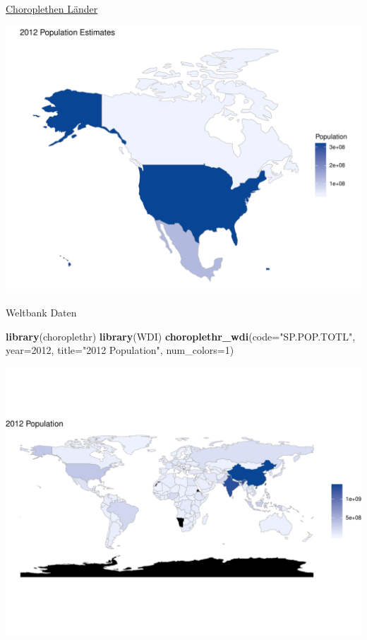\documentclass[ignorenonframetext,]{beamer}
\newenvironment{Shaded}{\begin{snugshade}}{\end{snugshade}}
\newcommand{\DataTypeTok}[1]{\textcolor[rgb]{0.13,0.29,0.53}{#1}}
\newcommand{\DecValTok}[1]{\textcolor[rgb]{0.00,0.00,0.81}{#1}}
\newcommand{\KeywordTok}[1]{\textcolor[rgb]{0.13,0.29,0.53}{\textbf{#1}}}
\newcommand{\NormalTok}[1]{#1}
\newcommand{\StringTok}[1]{\textcolor[rgb]{0.31,0.60,0.02}{#1}}
\begin{document}
\begin{frame}{\href{http://mirrors.softliste.de/cran/web/packages/choroplethr/vignettes/d-country-choropleth.html}{Choroplethen
Länder}}
\protect\hypertarget{choroplethen-lander-1}{}

\includegraphics{Choroplethen_files/figure-beamer/unnamed-chunk-24-1.pdf}

\end{frame}

\begin{frame}[fragile]{Weltbank Daten}
\protect\hypertarget{weltbank-daten}{}

\begin{Shaded}
\begin{Highlighting}[]
\KeywordTok{library}\NormalTok{(choroplethr)}
\KeywordTok{library}\NormalTok{(WDI) }
\KeywordTok{choroplethr_wdi}\NormalTok{(}\DataTypeTok{code=}\StringTok{"SP.POP.TOTL"}\NormalTok{, }\DataTypeTok{year=}\DecValTok{2012}\NormalTok{, }
                \DataTypeTok{title=}\StringTok{"2012 Population"}\NormalTok{, }
                \DataTypeTok{num_colors=}\DecValTok{1}\NormalTok{)}
\end{Highlighting}
\end{Shaded}

\includegraphics{Choroplethen_files/figure-beamer/unnamed-chunk-25-1.pdf}

\end{frame}
\end{document}
